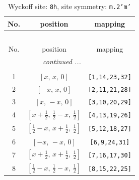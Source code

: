 \documentclass[fleqn,8pt]{jsarticle}
\begin{document}
\begin{longtable}{ccc}
\caption{Wyckoff site: {\tt 8h}, site symmetry: {\tt m.2'm'}}
 \\
 \hline \hline
No. & position & mapping \\ \hline \endfirsthead

\multicolumn{2}{l}{\tablename\ \thetable{}} \\
 \hline \hline
No. & position & mapping \\ \hline \endhead

 \hline \hline
\multicolumn{2}{r}{\footnotesize\it continued ...} \\ \endfoot

 \hline \hline
\multicolumn{2}{r}{} \\ \endlastfoot

1 & $\left[ x,\, x,\, 0 \right]$ & {\tt [1,14,23,32]} \\ \hline
2 & $\left[ - x,\, x,\, 0 \right]$ & {\tt [2,11,21,28]} \\ \hline
3 & $\left[ x,\, - x,\, 0 \right]$ & {\tt [3,10,20,29]} \\ \hline
4 & $\left[ x + \frac{1}{2},\, \frac{1}{2} - x,\, \frac{1}{2} \right]$ & {\tt [4,13,19,26]} \\ \hline
5 & $\left[ \frac{1}{2} - x,\, x + \frac{1}{2},\, \frac{1}{2} \right]$ & {\tt [5,12,18,27]} \\ \hline
6 & $\left[ - x,\, - x,\, 0 \right]$ & {\tt [6,9,24,31]} \\ \hline
7 & $\left[ x + \frac{1}{2},\, x + \frac{1}{2},\, \frac{1}{2} \right]$ & {\tt [7,16,17,30]} \\ \hline
8 & $\left[ \frac{1}{2} - x,\, \frac{1}{2} - x,\, \frac{1}{2} \right]$ & {\tt [8,15,22,25]} \\
\end{longtable}
\renewcommand{\arraystretch}{1.2}
\end{document}
